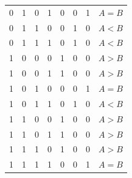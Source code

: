 \begin{center}
\begin{tabular}{cccc|ccc|c}
0              & 1              & 0              & 1              & 0                                      & 0                                      & 1                                      & $A =B$                                  \\
0              & 1              & 1              & 0              & 0                                      & 1                                      & 0                                      & $A < B$                                 \\
0              & 1              & 1              & 1              & 0                                      & 1                                      & 0                                      & $A < B$                                 \\
1              & 0              & 0              & 0              & 1                                      & 0                                      & 0                                      & $A > B$                                 \\
1              & 0              & 0              & 1              & 1                                      & 0                                      & 0                                      & $A > B$                                 \\
1              & 0              & 1              & 0              & 0                                      & 0                                      & 1                                      & $A = B$                                 \\
1              & 0              & 1              & 1              & 0                                      & 1                                      & 0                                      & $A < B$                                 \\
1              & 1              & 0              & 0              & 1                                      & 0                                      & 0                                      & $A > B$                                 \\
1              & 1              & 0              & 1              & 1                                      & 0                                      & 0                                      & $A > B$                                 \\
1              & 1              & 1              & 0              & 1                                      & 0                                      & 0                                      & $A > B$                                 \\
1              & 1              & 1              & 1              & 0                                      & 0                                      & 1                                      & $A = B$                                
\end{tabular}
\end{center}
